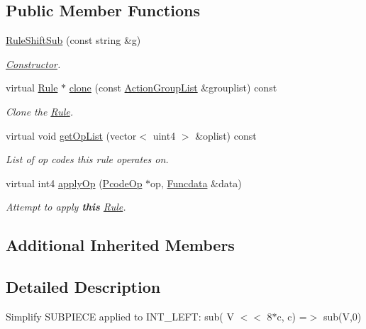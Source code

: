 \subsection*{Public Member Functions}
\begin{DoxyCompactItemize}
\item 
\mbox{\hyperlink{class_rule_shift_sub_af132ca6505dcd8b032e7d999ae0bd398}{Rule\+Shift\+Sub}} (const string \&g)
\begin{DoxyCompactList}\small\item\em \mbox{\hyperlink{class_constructor}{Constructor}}. \end{DoxyCompactList}\item 
virtual \mbox{\hyperlink{class_rule}{Rule}} $\ast$ \mbox{\hyperlink{class_rule_shift_sub_acc0a74c73acbe73c52f554e527d0eccb}{clone}} (const \mbox{\hyperlink{class_action_group_list}{Action\+Group\+List}} \&grouplist) const
\begin{DoxyCompactList}\small\item\em Clone the \mbox{\hyperlink{class_rule}{Rule}}. \end{DoxyCompactList}\item 
virtual void \mbox{\hyperlink{class_rule_shift_sub_a75979972410e1b852639aa2ffafccc1e}{get\+Op\+List}} (vector$<$ uint4 $>$ \&oplist) const
\begin{DoxyCompactList}\small\item\em List of op codes this rule operates on. \end{DoxyCompactList}\item 
virtual int4 \mbox{\hyperlink{class_rule_shift_sub_aea3b654c2ff4472bdb597f16d660df9c}{apply\+Op}} (\mbox{\hyperlink{class_pcode_op}{Pcode\+Op}} $\ast$op, \mbox{\hyperlink{class_funcdata}{Funcdata}} \&data)
\begin{DoxyCompactList}\small\item\em Attempt to apply {\bfseries{this}} \mbox{\hyperlink{class_rule}{Rule}}. \end{DoxyCompactList}\end{DoxyCompactItemize}
\subsection*{Additional Inherited Members}


\subsection{Detailed Description}
Simplify S\+U\+B\+P\+I\+E\+CE applied to I\+N\+T\+\_\+\+L\+E\+FT\+: {\ttfamily sub( V $<$$<$ 8$\ast$c, c) =$>$ sub(\+V,0)} 

